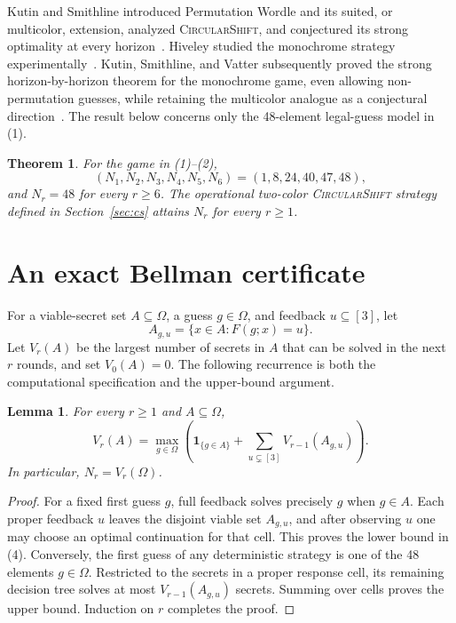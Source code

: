 \documentclass[11pt]{article}
\newtheorem{theorem}{Theorem}
\newtheorem{lemma}{Lemma}
\newcommand{\Om}{\Omega}
\begin{document}
Kutin and Smithline introduced Permutation Wordle and its suited, or
multicolor, extension, analyzed \textsc{CircularShift}, and conjectured its
strong optimality at every horizon~\cite{KutinSmithline2026}.  Hiveley studied
the monochrome strategy experimentally~\cite{Hiveley2025}.  Kutin, Smithline,
and Vatter subsequently proved the strong horizon-by-horizon theorem for the
monochrome game, even allowing non-permutation guesses, while retaining the
multicolor analogue as a conjectural direction~\cite{KutinSmithlineVatter2026}.
The result below concerns only the 48-element legal-guess model in (1).

\begin{theorem}\label{thm:main}
For the game in \emph{(1)--(2)},
\[
 (N_1,N_2,N_3,N_4,N_5,N_6)=(1,8,24,40,47,48),
 \tag{3}
\]
and $N_r=48$ for every $r\ge6$.  The operational two-color
\textnormal{\textsc{CircularShift}} strategy defined in Section~\ref{sec:cs} attains $N_r$
for every $r\ge1$.
\end{theorem}

\section{An exact Bellman certificate}\label{sec:bellman}

For a viable-secret set $A\subseteq\Om$, a guess $g\in\Om$, and feedback
$u\subseteq[3]$, let
\[
 A_{g,u}=\{x\in A:F(g;x)=u\}.
\]
Let $V_r(A)$ be the largest number of secrets in $A$ that can be solved in the
next $r$ rounds, and set $V_0(A)=0$.  The following recurrence is both the
computational specification and the upper-bound argument.

\begin{lemma}\label{lem:bellman}
For every $r\ge1$ and $A\subseteq\Om$,
\[
 V_r(A)=\max_{g\in\Om}\left(
    \mathbf 1_{\{g\in A\}}+
    \sum_{u\subsetneq[3]}V_{r-1}(A_{g,u})
 \right).
 \tag{4}
\]
In particular, $N_r=V_r(\Om)$.
\end{lemma}

\begin{proof}
For a fixed first guess $g$, full feedback solves precisely $g$ when $g\in A$.
Each proper feedback $u$ leaves the disjoint viable set $A_{g,u}$, and after
observing $u$ one may choose an optimal continuation for that cell.  This
proves the lower bound in (4).  Conversely, the first guess of any deterministic
strategy is one of the 48 elements $g\in\Om$.  Restricted to the secrets in a
proper response cell, its remaining decision tree solves at most
$V_{r-1}(A_{g,u})$ secrets.  Summing over cells proves the upper bound.
Induction on $r$ completes the proof.
\end{proof}
\end{document}

